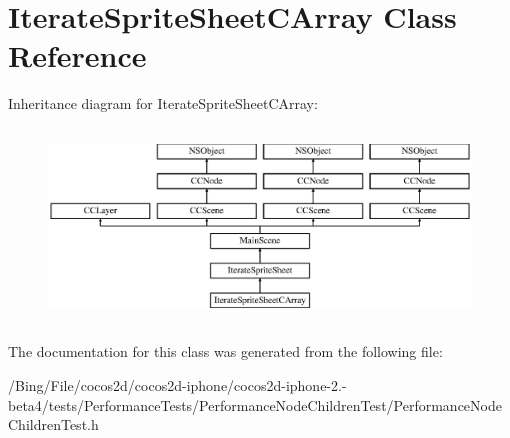 \hypertarget{interface_iterate_sprite_sheet_c_array}{\section{Iterate\-Sprite\-Sheet\-C\-Array Class Reference}
\label{interface_iterate_sprite_sheet_c_array}
}
Inheritance diagram for Iterate\-Sprite\-Sheet\-C\-Array\-:\begin{figure}[H]
\begin{center}
\leavevmode
\includegraphics[height=5.185185cm]{interface_iterate_sprite_sheet_c_array}
\end{center}
\end{figure}


The documentation for this class was generated from the following file\-:\begin{DoxyCompactItemize}
\item 
/\-Bing/\-File/cocos2d/cocos2d-\/iphone/cocos2d-\/iphone-\/2.-\/beta4/tests/\-Performance\-Tests/\-Performance\-Node\-Children\-Test/Performance\-Node\-Children\-Test.\-h\end{DoxyCompactItemize}
